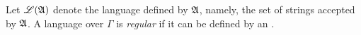 Let ${\mathscr{L} }({\mathfrak{A} })$ denote the language defined by ${\mathfrak{A} }$, namely, the set of strings accepted by ${\mathfrak{A} }$. 
%
%
A language over $\Gamma$ is \emph{regular} if it can be defined by an \NFA.
%
%

%

